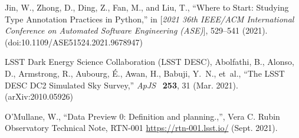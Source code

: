 \documentclass[]{spie}
\newcommand{\apjs}{ApJS}
\begin{document}
\begin{thebibliography}{10}
  Jin, W., Zhong, D., Ding, Z., Fan, M., and Liu, T., ``{Where to Start: Studying
    Type Annotation Practices in Python},'' in [{\em 2021 36th IEEE/ACM
    International Conference on Automated Software Engineering
    (ASE)}{\nolinebreak\hspace{0.1em}]},   529--541 (2021).
    (doi:10.1109/ASE51524.2021.9678947)

  {LSST Dark Energy Science Collaboration (LSST DESC)}, {Abolfathi}, B.,
    {Alonso}, D., {Armstrong}, R., {Aubourg}, {\'E}., {Awan}, H., {Babuji},
    Y.~N., et~al., ``{The LSST DESC DC2 Simulated Sky Survey},'' {\em \apjs}~{\bf
    253},  31 (Mar. 2021). (arXiv:2010.05926)

  O'Mullane, W., ``{Data Preview 0: Definition and planning.},'', Vera C. Rubin
    Observatory Technical Note, RTN-001 \url{https://rtn-001.lsst.io/} (Sept.
    2021).

  \end{thebibliography}
\end{document}
